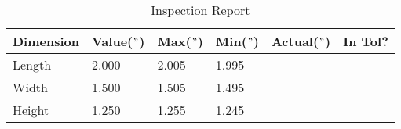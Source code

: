 \documentclass{article}
\begin{document}
\begin{table}[ht]
\centering
\caption{Inspection Report}

	\renewcommand\arraystretch{3}
	\begin{tabular}{l | m{2cm} | m{2cm} | m{2cm} | m{2cm} | m{2cm} |}
		Dimension & Value($"$) & Max($"$) & Min($"$)  & Actual($"$) & In Tol? \\
		\hline
		Length & 2.000 & 2.005 & 1.995 & & \\
		\hline
		Width & 1.500 & 1.505 & 1.495 & & \\
		\hline 
		Height & 1.250 & 1.255 & 1.245 & & \\
		\hline
	\end{tabular}
\end{table}
\end{document}

